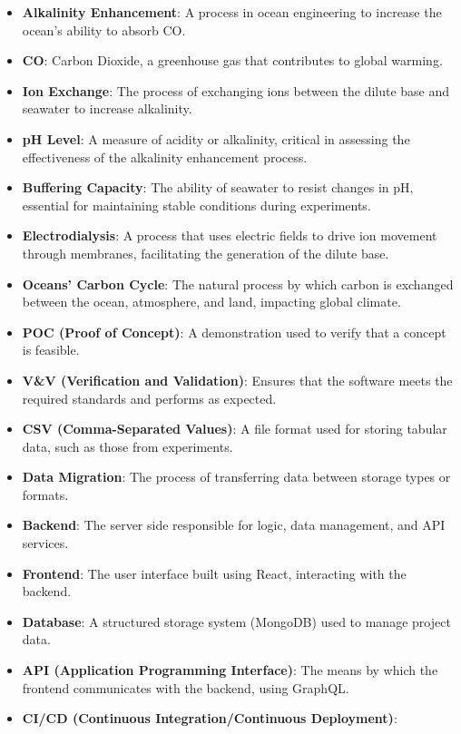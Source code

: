 \documentclass[12pt]{article}
\begin{document}
\begin{itemize}
    \item \textbf{Alkalinity Enhancement}: A process in ocean engineering to
    increase the ocean's ability to absorb CO.
    \item \textbf{CO}: Carbon Dioxide, a greenhouse gas that contributes to
    global warming.
    \item \textbf{Ion Exchange}: The process of exchanging ions between the
    dilute base and seawater to increase alkalinity.
    \item \textbf{pH Level}: A measure of acidity or alkalinity, critical in
    assessing the effectiveness of the alkalinity enhancement process.
    \item \textbf{Buffering Capacity}: The ability of seawater to resist changes
    in pH, essential for maintaining stable conditions during experiments.
    \item \textbf{Electrodialysis}: A process that uses electric fields to drive
    ion movement through membranes, facilitating the generation of the dilute
    base.
    \item \textbf{Oceans' Carbon Cycle}: The natural process by which carbon is
    exchanged between the ocean, atmosphere, and land, impacting global climate.
    \item \textbf{POC (Proof of Concept)}: A demonstration used to verify that a
    concept is feasible.
    \item \textbf{V\&V (Verification and Validation)}: Ensures that the software
    meets the required standards and performs as expected.
    \item \textbf{CSV (Comma-Separated Values)}: A file format used for storing
    tabular data, such as those from experiments.
    \item \textbf{Data Migration}: The process of transferring data between
    storage types or formats.
    \item \textbf{Backend}: The server side responsible for logic, data
    management, and API services.
    \item \textbf{Frontend}: The user interface built using React, interacting
    with the backend.
    \item \textbf{Database}: A structured storage system (MongoDB) used to
    manage project data.
    \item \textbf{API (Application Programming Interface)}: The means by which
    the frontend communicates with the backend, using GraphQL.
    \item \textbf{CI/CD (Continuous Integration/Continuous Deployment)}:

\end{itemize}
\end{document}
